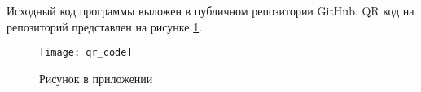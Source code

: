     
Исходный код программы выложен в публичном репозитории GitHub. QR код на репозиторий представлен на рисунке \ref{fig:a1}.

\begin{figure}
    \texttt{[image: qr\_code]}
    \caption{Рисунок в приложении}
    \label{fig:a1}
\end{figure}